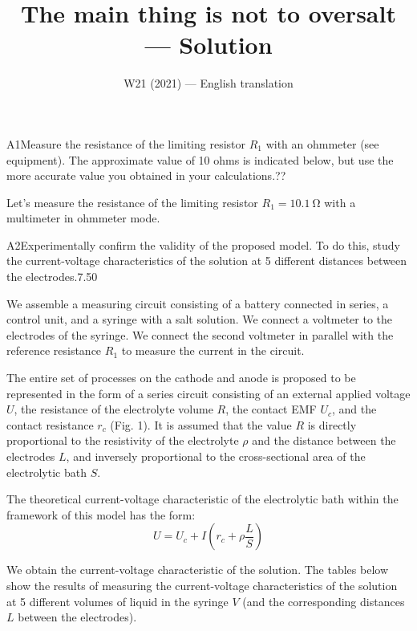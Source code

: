 \documentclass[11pt,a4paper]{article}
\title{\textbf{The main thing is not to oversalt --- Solution}}
\author{\normalsize W21 (2021) — English translation}
\date{}
\begin{document}
\maketitle\vspace{-0.5em}

\begin{solcard}{A1}{Measure the resistance of the limiting resistor $R_1$ with an ohmmeter (see equipment). The approximate value of 10 ohms is indicated below, but use the more accurate value you obtained in your calculations.}{??}

Let's measure the resistance of the limiting resistor $R_1 = 10.1~\mathrm{\Omega}$ with a multimeter in ohmmeter mode.

\end{solcard}

\begin{solcard}{A2}{Experimentally confirm the validity of the proposed model. To do this, study the current-voltage characteristics of the solution at 5 different distances between the electrodes.}{7.50}

We assemble a measuring circuit consisting of a battery connected in series, a control unit, and a syringe with a salt solution. We connect a voltmeter to the electrodes of the syringe. We connect the second voltmeter in parallel with the reference resistance $R_1$ to measure the current in the circuit.

The entire set of processes on the cathode and anode is proposed to be represented in the form of a series circuit consisting of an external applied voltage $U$, the resistance of the electrolyte volume $R$, the contact EMF $U_c$, and the contact resistance $r_c$ (Fig. 1). It is assumed that the value $R$ is directly proportional to the resistivity of the electrolyte $\rho$ and the distance between the electrodes $L$, and inversely proportional to the cross-sectional area of the electrolytic bath $S$.

The theoretical current-voltage characteristic of the electrolytic bath within the framework of this model has the form:
\[ U = U_c + I \left( r_c + \rho \frac{L}{S} \right) \]

We obtain the current-voltage characteristic of the solution. The tables below show the results of measuring the current-voltage characteristics of the solution at 5 different volumes of liquid in the syringe $V$ (and the corresponding distances $L$ between the electrodes).


\end{solcard}
\end{document}
